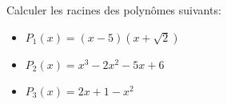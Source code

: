 \bexo
Calculer les racines des polynômes suivants:

\begin{itemize}
	\item $P_1(x) = (x-5)(x+\sqrt{2})$
	\item $P_2(x) = x^3 - 2x^2 - 5x + 6$
	\item $P_3(x) = 2x + 1 - x^2$
\end{itemize}

\vspace*{6cm}
\eexo


